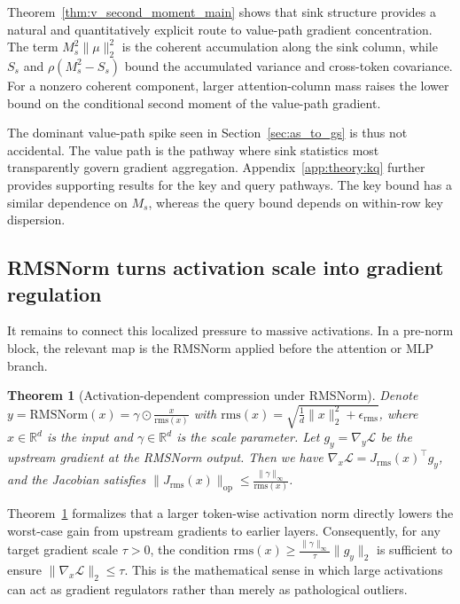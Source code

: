 \documentclass{article}
\theoremstyle{plain}
\newtheorem{theorem}{Theorem}
\theoremstyle{definition}
\theoremstyle{remark}
\begin{document}
Theorem~\ref{thm:v_second_moment_main} shows that sink structure provides a natural and quantitatively explicit route to value-path gradient concentration. The term $M_s^2\|\mu\|_2^2$ is the coherent accumulation along the sink column, while $S_s$ and $\rho(M_s^2-S_s)$ bound the accumulated variance and cross-token covariance. For a nonzero coherent component, larger attention-column mass raises the lower bound on the conditional second moment of the value-path gradient.

The dominant value-path spike seen in Section~\ref{sec:as_to_gs} is thus not accidental. The value path is the pathway where sink statistics most transparently govern gradient aggregation. Appendix~\ref{app:theory:kq} further provides supporting results for the key and query pathways. The key bound has a similar dependence on $M_s$, whereas the query bound depends on within-row key dispersion.

\subsection{RMSNorm turns activation scale into gradient regulation}

It remains to connect this localized pressure to massive activations. In a pre-norm block, the relevant map is the RMSNorm applied before the attention or MLP branch.

\begin{theorem}[Activation-dependent compression under RMSNorm]\label{thm:rms_compress_main}
Denote $y=\mathrm{RMSNorm}(x) = \gamma \odot \frac{x}{\mathrm{rms}(x)}$ with $\mathrm{rms}(x)=\sqrt{\frac{1}{d}\|x\|_2^2+\epsilon_{\mathrm{rms}}}$, where $x\in \mathbb{R}^d$ is the input and $\gamma\in \mathbb{R}^d$ is the scale parameter. Let $g_y=\nabla_y\mathcal{L}$ be the upstream gradient at the RMSNorm output.
Then we have $\nabla_x\mathcal{L}=J_{\mathrm{rms}}(x)^\top g_y$, and the Jacobian satisfies $\|J_{\mathrm{rms}}(x)\|_{\mathrm{op}} \le \frac{\|\gamma\|_\infty}{\mathrm{rms}(x)}$.
\end{theorem}

Theorem~\ref{thm:rms_compress_main} formalizes that a larger token-wise activation norm directly lowers the worst-case gain from upstream gradients to earlier layers. Consequently, for any target gradient scale $\tau>0$, the condition $\mathrm{rms}(x)\ge \frac{\|\gamma\|_\infty}{\tau}\|g_y\|_2$ is sufficient to ensure $\|\nabla_x\mathcal{L}\|_2\le\tau$. This is the mathematical sense in which large activations can act as gradient regulators rather than merely as pathological outliers.
\end{document}
